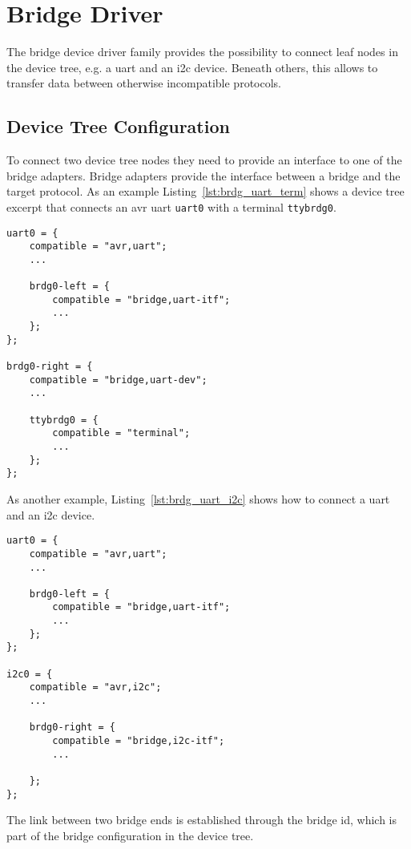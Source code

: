 %
%
%



\section{Bridge Driver}
	The bridge device driver family provides the possibility to connect leaf nodes in the device tree, e.g. a uart and an i2c device. Beneath others, this allows to transfer data between otherwise incompatible protocols.

	\subsection{Device Tree Configuration}
		To connect two device tree nodes they need to provide an interface to one of the bridge adapters. Bridge adapters provide the interface between a bridge and the target protocol.
		As an example Listing~\ref{lst:brdg_uart_term} shows a device tree excerpt that connects an avr uart \lstinline{uart0} with a terminal \lstinline{ttybrdg0}.

		\begin{lstlisting}[label={lst:brdg_uart_term},caption={Bridge example: uart to terminal bridge.}]
uart0 = {
	compatible = "avr,uart";
	...

	brdg0-left = {
		compatible = "bridge,uart-itf";
		...
	};
};

brdg0-right = {
	compatible = "bridge,uart-dev";
	...

	ttybrdg0 = {
		compatible = "terminal";
		...
	};
};
		\end{lstlisting}

		As another example, Listing~\ref{lst:brdg_uart_i2c} shows how to connect a uart and an i2c device.

		\begin{lstlisting}[label={lst:brdg_uart_i2c},caption={Bridge example: uart to i2c bridge.}]
uart0 = {
	compatible = "avr,uart";
	...

	brdg0-left = {
		compatible = "bridge,uart-itf";
		...
	};
};

i2c0 = {
	compatible = "avr,i2c";
	...

	brdg0-right = {
		compatible = "bridge,i2c-itf";
		...

	};
};
		\end{lstlisting}

		The link between two bridge ends is established through the bridge id, which is part of the bridge configuration in the device tree.

